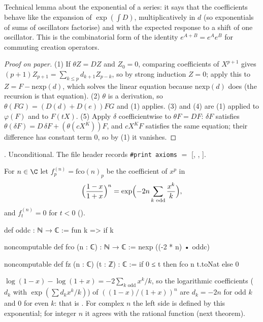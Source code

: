 \begin{physics}
Technical lemma about the exponential of a series: it says that the coefficients behave like the expansion of $\exp(\int D)$, multiplicatively in $d$ (so exponentials of sums of oscillators factorise) and with the expected response to a shift of one oscillator. This is the combinatorial form of the identity $e^{A+B}=e^Ae^B$ for commuting creation operators.
\end{physics}
\begin{proof}[Proof on paper]
(1) If $\theta Z=DZ$ and $Z_0=0$, comparing coefficients of $X^{p+1}$ gives
$(p+1)Z_{p+1}=\sum_{k\le p}d_{k+1}Z_{p-k}$, so by strong induction $Z=0$; apply this to
$Z=F-\mathrm{nexp}(d)$, which solves the linear equation because $\mathrm{nexp}(d)$ does (the
recursion is that equation).  (2) $\theta$ is a derivation, so $\theta(FG)=(D(d)+D(e))FG$ and
(1) applies.  (3) and (4) are (1) applied to $\varphi(F)$ and to $F(tX)$.  (5) Apply $\delta$
coefficientwise to $\theta F=DF$: $\delta F$ satisfies $\theta(\delta F)=D\,\delta F+(\theta
(cX^K))F$, and $cX^KF$ satisfies the same equation; their difference has constant term $0$, so
by (1) it vanishes.
\end{proof}
\begin{status}
.  Unconditional.  The file header records
\texttt{\#print axioms} $=$ [, , ].
\end{status}

\begin{definition}\label{ch08:def:fco}
For $n\in\C$ let $f^{(n)}_p=\mathrm{fco}(n)_p$ be the coefficient of $x^p$ in
\begin{equation*}
  \Bigl(\frac{1-x}{1+x}\Bigr)^n=\exp\Bigl(-2n\sum_{k\text{ odd}}\frac{x^k}{k}\Bigr),
\end{equation*}
and $f^{(n)}_t=0$ for $t<0$ ().
\end{definition}
\begin{leancode}
def oddc : ℕ → ℂ := fun k => if k %

noncomputable def fco (n : ℂ) : ℕ → ℂ := nexp ((-2 * n) • oddc)

noncomputable def fz (n : ℂ) (t : ℤ) : ℂ := if 0 ≤ t then fco n t.toNat else 0
\end{leancode}
\begin{dictionary}
$\log(1-x)-\log(1+x)=-2\sum_{k\text{ odd}}x^k/k$, so the logarithmic coefficients ($d_k$ with
$\exp(\sum d_kx^k/k)$) of $((1-x)/(1+x))^n$ are $d_k=-2n$ for odd $k$ and $0$ for even $k$: that is
.  For complex $n$ the left side is defined by this exponential; for
integer $n$ it agrees with the rational function (next theorem).
\end{dictionary}

